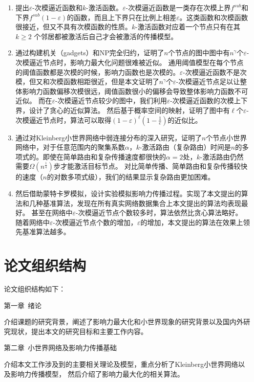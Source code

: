 \begin{enumerate}
\item  提出$\varepsilon$-次模逼近函数和$k$-激活函数。$\varepsilon$-次模逼近函数是一类存在次模上界$f^{sub}$和下界$f^{sub}(1-\varepsilon)$的函数，而且上下界只在比例上相差$\varepsilon$。这类函数和次模函数很接近，但又不具有次模函数的性质。$k$-激活函数对应着一个节点只有在其$k \geq 2$ 个邻居都被激活后自己才会被激活的传播模型。
\item  通过构建机关（gadgets）和NP完全归约，证明了$n$个节点的图中图中有$n^{\gamma}$个$\varepsilon$-次模逼近节点时，影响力最大化问题很难被近似。
通用阈值模型在每个节点的阈值函数都是次模的时候，影响力函数也是次模的\cite{Mossel2007sub}。$\varepsilon$-次模逼近函数不是次模，但又和次模函数相距很近，但是本文证明了$n^{\gamma}$个$\varepsilon$-次模逼近节点足以让整体影响力函数偏移次模很远，阈值函数很小的偏移会导致整体影响力函数不可近似。
而在$\varepsilon$-次模逼近节点较少的图中，我们利用$\varepsilon$-次模逼近函数的次模上下界，设计了贪心的近似算法。
然后基于概率空间的映射，证明了图中有$\ell$个$\varepsilon$-次模逼近节点时，算法可以取得$(1-\varepsilon)^{\ell}(1-\frac{1}{e})$的近似比。
\item  通过对Kleinberg小世界网络中弱连接分布的深入研究，证明了$n$个节点小世界网络中，对于任意范围内的聚集系数$\alpha$，$k$-激活路由（复杂路由）时间是$n$的多项式的。即使在简单路由和复杂传播速度都很快的$\alpha=2$处，$k$-激活路由仍然需要$\Omega(n^{\frac{1}{4}})$步才能激活目标节点。
对比简单传播、简单路由和复杂传播较快的速度（$n$的对数多项式级），我们的结果显示复杂路由更加困难。
\item  然后借助蒙特卡罗模拟，设计实验模拟影响力传播过程。实现了本文提出的算法和几种基准算法，发现在所有真实网络数据集合上本文提出的算法均表现最好。
甚至在网络中$\varepsilon$-次模逼近节点个数较多时，算法依然比贪心算法略好。
随着网络中$\varepsilon$-次模逼近节点个数的增加，$\varepsilon$的增加，本文提出的算法在效果上领先基准算法越多。
\end{enumerate}

\section{论文组织结构}
论文组织结构如下：

第一章~绪论

介绍课题的研究背景，阐述了影响力最大化和小世界现象的研究背景以及国内外研究现状，提出本文的研究目标和主要工作内容。

第二章~小世界网络及影响力传播基础

介绍本文工作涉及到的主要相关理论及模型，重点分析了Kleinberg小世界网络以及影响力传播模型，
然后介绍了影响力最大化的相关算法。

